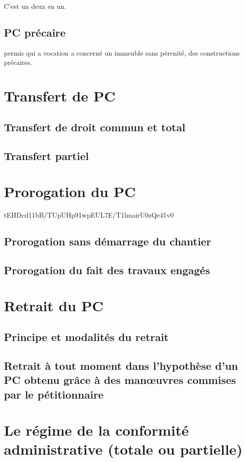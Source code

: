 		C'est un deux en un.

	\subsection{PC précaire}

		permis qui a vocation a concerné un immeuble sans pérenité, des constructions précaires.

\section{Transfert de PC}

	\subsection{Transfert de droit commun et total}

	\subsection{Transfert partiel}

\section{Prorogation du PC}

tEHDcd11bB/TUpUHp91wpEUL7E/T1lmairU0zQe41v0

	\subsection{Prorogation sans démarrage du chantier}

	\subsection{Prorogation du fait des travaux engagés}

\section{Retrait du PC}

	\subsection{Principe et modalités du retrait}

	\subsection{Retrait à tout moment dans l'hypothèse d'un PC obtenu grâce à des manœuvres commises par le pétitionnaire}

\section{Le régime de la conformité administrative (totale ou partielle)}
